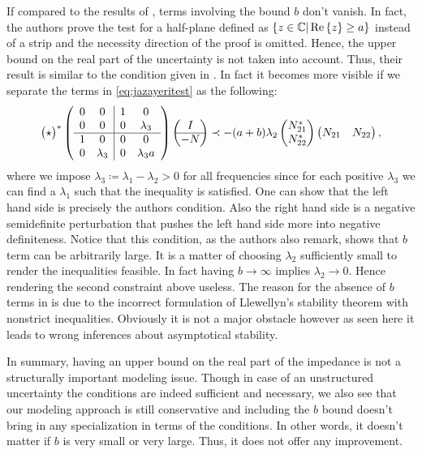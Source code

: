 If compared to the results of \cite{jazayeri}, terms involving the bound $b$ don't vanish. In fact, the authors prove the 
test for a half-plane defined as $\left\{z\in\mathbb{C}|\operatorname{Re}\left\{ z \right\}\geq a\right\}$ instead of a strip and the necessity direction 
of the proof is omitted. Hence, the upper bound on the real part of the uncertainty is not taken into account. Thus, their 
result is similar to the condition given in . In fact it becomes more visible if we separate the terms
in \eqref{eq:jazayeritest} as the following:
\[
\begin{pmatrix}\star\end{pmatrix}^*
\left(\begin{array}{cc|cc}
      0 &0                   &1 &0                  \\
      0 &0                   &0 &\lambda_3\\ \hline
      1 &0                   &0 &0                  \\
      0 &\lambda_3           &0 &\lambda_3 a
\end{array}\right)
\begin{pmatrix}I\\\hline-N\end{pmatrix} \prec
-(a+b)\lambda_2
\begin{pmatrix}N_{21}^*\\N_{22}^*\end{pmatrix}
\begin{pmatrix}N_{21} &N_{22}\end{pmatrix},
\]
where we impose $\lambda_3\coloneqq \lambda_1 - \lambda_2 > 0$ for all frequencies since for each positive $\lambda_3$ we can find
a $\lambda_1$ such that the inequality is satisfied. One can show that the left hand side is precisely the authors condition. Also
the right hand side is a negative semidefinite perturbation that pushes the left hand side more into negative definiteness. Notice 
that this condition, as the authors also remark, shows that $b$ term can be arbitrarily large. It is a matter of choosing $\lambda_2$ 
sufficiently small to render the inequalities feasible. In fact having $b\to\infty$ implies $\lambda_2\to 0$. Hence rendering the 
second constraint above useless. The reason for the absence of $b$ terms in \cite{jazayeri} is due to the incorrect formulation of 
Llewellyn's stability theorem with nonstrict inequalities. Obviously it is not a major obstacle however as seen here it leads to wrong
inferences about asymptotical stability. 


In summary, having an upper bound on the real part of the impedance is not a structurally important modeling issue. Though in case of
an unstructured uncertainty the conditions are indeed sufficient and necessary, we also see that our modeling approach is still
conservative and including the $b$ bound doesn't bring in any specialization in terms of the conditions. In other words, it doesn't 
matter if $b$ is very small or very large. Thus, it does not offer any improvement.


